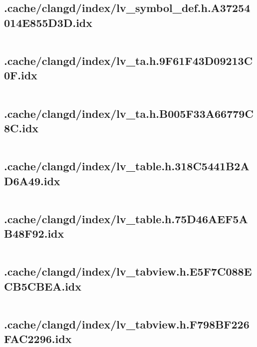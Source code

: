 \subsection{.cache/clangd/index/lv_symbol_def.h.A37254014E855D3D.idx}
\inputminted[linenos,tabsize=2,breaklines, breakanywhere]{c}{lv_symbol_def.h.A37254014E855D3D.idx}
\pagebreak

\subsection{.cache/clangd/index/lv_ta.h.9F61F43D09213C0F.idx}
\inputminted[linenos,tabsize=2,breaklines, breakanywhere]{c}{lv_ta.h.9F61F43D09213C0F.idx}
\pagebreak

\subsection{.cache/clangd/index/lv_ta.h.B005F33A66779C8C.idx}
\inputminted[linenos,tabsize=2,breaklines, breakanywhere]{c}{lv_ta.h.B005F33A66779C8C.idx}
\pagebreak

\subsection{.cache/clangd/index/lv_table.h.318C5441B2AD6A49.idx}
\inputminted[linenos,tabsize=2,breaklines, breakanywhere]{c}{lv_table.h.318C5441B2AD6A49.idx}
\pagebreak

\subsection{.cache/clangd/index/lv_table.h.75D46AEF5AB48F92.idx}
\inputminted[linenos,tabsize=2,breaklines, breakanywhere]{c}{lv_table.h.75D46AEF5AB48F92.idx}
\pagebreak

\subsection{.cache/clangd/index/lv_tabview.h.E5F7C088ECB5CBEA.idx}
\inputminted[linenos,tabsize=2,breaklines, breakanywhere]{c}{lv_tabview.h.E5F7C088ECB5CBEA.idx}
\pagebreak

\subsection{.cache/clangd/index/lv_tabview.h.F798BF226FAC2296.idx}
\inputminted[linenos,tabsize=2,breaklines, breakanywhere]{c}{lv_tabview.h.F798BF226FAC2296.idx}
\pagebreak

